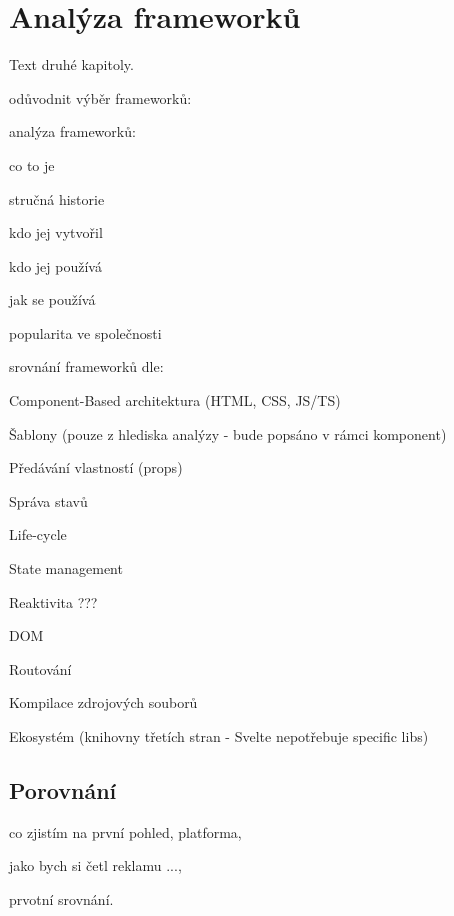 \section{Analýza frameworků}

Text druhé kapitoly.

\begin{citemize}
	\item odůvodnit výběr frameworků:
	\begin{citemize}
		\item {}
	\end{citemize}

	\item analýza frameworků:
	\begin{citemize}
		\item co to je
		\item stručná historie
		\item kdo jej vytvořil
		\item kdo jej používá
		\item jak se používá
		\item popularita ve společnosti
	\end{citemize}

	\item srovnání frameworků dle:
	\begin{cenumerate}
		\item Component-Based architektura (HTML, CSS, JS/TS)
		\item Šablony (pouze z hlediska analýzy - bude popsáno v rámci komponent)
		\item Předávání vlastností (props)
		\item Správa stavů
		\item Life-cycle
		\item State management
		\item Reaktivita ???
		\item DOM %
		\item Routování
		\item Kompilace zdrojových souborů %
		\item Ekosystém (knihovny třetích stran - Svelte nepotřebuje specific libs)
	\end{cenumerate}
\end{citemize}







\subsection{Porovnání}

\begin{citemize}
	\item co zjistím na první pohled, platforma,
	\item jako bych si četl reklamu ...,
	\item prvotní srovnání.
\end{citemize}
